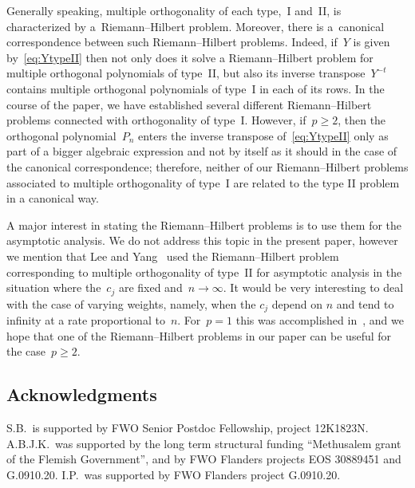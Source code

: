 \documentclass[pdftex]{sigma}
\numberwithin{equation}{section}
\begin{document}
 Generally speaking, multiple orthogonality of each type,~I and~II, is characterized by a~Rie\-mann--Hilbert problem. Moreover, there is a~canonical correspondence between such Riemann--Hilbert problems. Indeed, if~$Y$ is given by~\eqref{eq:YtypeII} then not only does it solve a Riemann--Hilbert problem for multiple orthogonal polynomials of type~II, but also its inverse transpose~$Y^{-t}$ contains multiple orthogonal polynomials of type~I in each of its rows. In the course of the paper, we have established several different Riemann--Hilbert problems connected with orthogonality of type~I. However, if~$p \geq 2$, then the orthogonal polynomial~$P_n$ enters the inverse transpose of~\eqref{eq:YtypeII} only as part of a bigger algebraic expression and not by itself as it should in the case of the canonical correspondence; therefore, neither of our Riemann--Hilbert problems associated to multiple orthogonality of type~I are related to the type II problem in a canonical way.

 A major interest in stating the Riemann--Hilbert problems is to use them for the asymptotic analysis. We do not address this topic in the present paper, however we mention that Lee and Yang~\cite{LY3} used the Riemann--Hilbert problem corresponding to multiple orthogonality of type~II for asymptotic analysis in the situation where the~$c_j$ are fixed and~$n \to \infty$. It would be very interesting to deal with the case of varying weights, namely, when the $c_j$ depend on $n$ and tend to infinity at a rate proportional to~$n$. For~$p=1$ this was accomplished in~\cite{BBLM}, and we hope that one of the Riemann--Hilbert problems in our paper can be useful for the case~$p \geq 2$.

 \subsection*{Acknowledgments}
S.B.\ is supported by FWO Senior Postdoc Fellowship, project 12K1823N. A.B.J.K.\ was supported by the long term structural funding ``Methusalem grant of the Flemish Government'', and by FWO Flanders projects EOS 30889451 and G.0910.20. I.P.\ was supported by FWO Flanders project G.0910.20.
\end{document}
